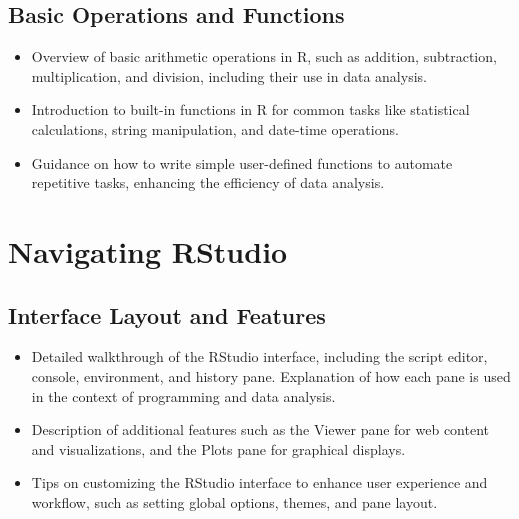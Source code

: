 \documentclass[
]{book}
\begin{document}
\hypertarget{basic-operations-and-functions}{%
\subsection*{Basic Operations and Functions}\label{basic-operations-and-functions}}

\begin{itemize}
\item
  Overview of basic arithmetic operations in R, such as addition, subtraction, multiplication, and division, including their use in data analysis.
\item
  Introduction to built-in functions in R for common tasks like statistical calculations, string manipulation, and date-time operations.
\item
  Guidance on how to write simple user-defined functions to automate repetitive tasks, enhancing the efficiency of data analysis.
\end{itemize}

\hypertarget{navigating-rstudio}{%
\section*{Navigating RStudio}\label{navigating-rstudio}}

\hypertarget{interface-layout-and-features}{%
\subsection*{Interface Layout and Features}\label{interface-layout-and-features}}

\begin{itemize}
\item
  Detailed walkthrough of the RStudio interface, including the script editor, console, environment, and history pane. Explanation of how each pane is used in the context of programming and data analysis.
\item
  Description of additional features such as the Viewer pane for web content and visualizations, and the Plots pane for graphical displays.
\item
  Tips on customizing the RStudio interface to enhance user experience and workflow, such as setting global options, themes, and pane layout.
\end{itemize}
\end{document}
